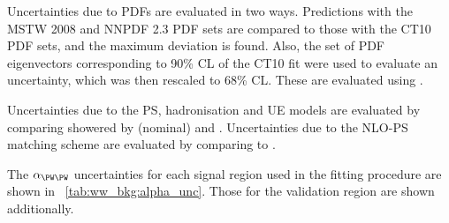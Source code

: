 Uncertainties due to PDFs are evaluated in two ways. Predictions with the MSTW 2008 
\cite{MSTW} and NNPDF 2.3 \cite{NNPDF} PDF sets are compared to those with the CT10 
\cite{CTEQ} PDF sets, and the maximum deviation is found. Also, the set of PDF 
eigenvectors corresponding to 90\% CL of the CT10 fit were used to evaluate an 
uncertainty, which was then rescaled to 68\% CL. These are evaluated using \amcatnlo.

Uncertainties due to the PS, hadronisation and UE models are evaluated by 
comparing \powhegbox showered by  (nominal) and \fherwig. 
Uncertainties due to the NLO-PS matching scheme are evaluated by comparing 
\meps{\powhegbox}{\fherwig} to \meps{\amcatnlo}{\fherwig}.

The $\alpha_{\WW}$ uncertainties for each signal region used in the fitting procedure are 
shown in \Table~\ref{tab:ww_bkg:alpha_unc}. Those for the validation region are shown 
additionally.

